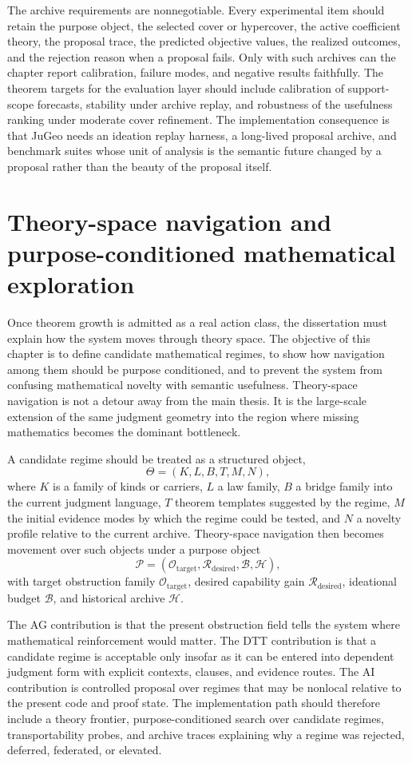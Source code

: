 \documentclass[11pt]{report}
\begin{document}
The archive requirements are nonnegotiable. Every experimental item should retain the purpose object, the selected cover or hypercover, the active coefficient theory, the proposal trace, the predicted objective values, the realized outcomes, and the rejection reason when a proposal fails. Only with such archives can the chapter report calibration, failure modes, and negative results faithfully. The theorem targets for the evaluation layer should include calibration of support-scope forecasts, stability under archive replay, and robustness of the usefulness ranking under moderate cover refinement. The implementation consequence is that JuGeo needs an ideation replay harness, a long-lived proposal archive, and benchmark suites whose unit of analysis is the semantic future changed by a proposal rather than the beauty of the proposal itself.

\chapter{Theory-space navigation and purpose-conditioned mathematical exploration}
Once theorem growth is admitted as a real action class, the dissertation must explain how the system moves through theory space. The objective of this chapter is to define candidate mathematical regimes, to show how navigation among them should be purpose conditioned, and to prevent the system from confusing mathematical novelty with semantic usefulness. Theory-space navigation is not a detour away from the main thesis. It is the large-scale extension of the same judgment geometry into the region where missing mathematics becomes the dominant bottleneck.

A candidate regime should be treated as a structured object,
\[
\Theta = (K, L, B, T, M, N),
\]
where $K$ is a family of kinds or carriers, $L$ a law family, $B$ a bridge family into the current judgment language, $T$ theorem templates suggested by the regime, $M$ the initial evidence modes by which the regime could be tested, and $N$ a novelty profile relative to the current archive. Theory-space navigation then becomes movement over such objects under a purpose object
\[
\mathcal{P} = (\mathcal{O}_{\mathrm{target}}, \mathcal{R}_{\mathrm{desired}}, \mathcal{B}, \mathcal{H}),
\]
with target obstruction family $\mathcal{O}_{\mathrm{target}}$, desired capability gain $\mathcal{R}_{\mathrm{desired}}$, ideational budget $\mathcal{B}$, and historical archive $\mathcal{H}$.

The AG contribution is that the present obstruction field tells the system where mathematical reinforcement would matter. The DTT contribution is that a candidate regime is acceptable only insofar as it can be entered into dependent judgment form with explicit contexts, clauses, and evidence routes. The AI contribution is controlled proposal over regimes that may be nonlocal relative to the present code and proof state. The implementation path should therefore include a theory frontier, purpose-conditioned search over candidate regimes, transportability probes, and archive traces explaining why a regime was rejected, deferred, federated, or elevated.
\end{document}
